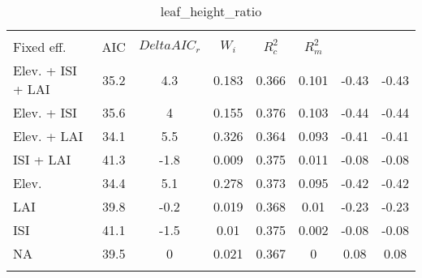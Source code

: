 
\begin{table}[!htbp] \centering 
  \caption{leaf_height_ratio} 
  \label{leaf_height_ratio} 
\begin{tabular}{@{\extracolsep{5pt}} lS[table-format=3.2]S[table-format=3.2]S[table-format=3.2]S[table-format=3.2]S[table-format=3.2]S[table-format=3.2]S[table-format=3.2]} 
\\[-1.8ex]\hline 
\hline \\[-1.8ex] 
{Fixed eff.} & {AIC} & {$Delta{}AIC_r$} & {$W_i$} & {$R^2_c$} & {$R^2_m$} %
\hline \\[-1.8ex] 
Elev. + ISI + LAI & 35.2 & 4.3 & 0.183 & 0.366 & 0.101 & -0.43 & -0.43 \\ 
Elev. + ISI & 35.6 & 4 & 0.155 & 0.376 & 0.103 & -0.44 & -0.44 \\ 
Elev. + LAI & 34.1 & 5.5 & 0.326 & 0.364 & 0.093 & -0.41 & -0.41 \\ 
ISI + LAI & 41.3 & -1.8 & 0.009 & 0.375 & 0.011 & -0.08 & -0.08 \\ 
Elev. & 34.4 & 5.1 & 0.278 & 0.373 & 0.095 & -0.42 & -0.42 \\ 
LAI & 39.8 & -0.2 & 0.019 & 0.368 & 0.01 & -0.23 & -0.23 \\ 
ISI & 41.1 & -1.5 & 0.01 & 0.375 & 0.002 & -0.08 & -0.08 \\ 
NA & 39.5 & 0 & 0.021 & 0.367 & 0 & 0.08 & 0.08 \\ 
\hline \\[-1.8ex] 
\end{tabular} 
\end{table} 
